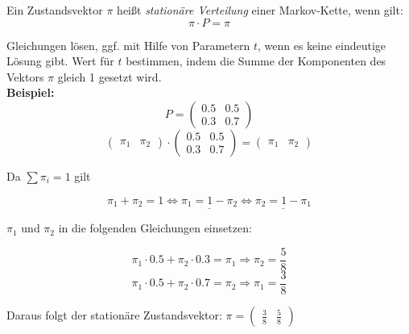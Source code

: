 Ein Zustandsvektor \(\pi\) heißt \emph{stationäre Verteilung} einer Markov-Kette, wenn gilt:
\begin{equation*}
    \pi \cdot P = \pi
\end{equation*}

Gleichungen lösen, ggf. mit Hilfe von Parametern \(t\), wenn es keine eindeutige Lösung gibt. Wert für \(t\) bestimmen, indem die Summe der Komponenten des Vektors \(\pi\) gleich 1 gesetzt wird.\\

\textbf{Beispiel:}
\begin{equation*}
    P = \begin{pmatrix}
        0.5 & 0.5\\
        0.3 & 0.7
    \end{pmatrix}
\end{equation*}
\begin{equation*}
    \begin{pmatrix}
        \pi_1 & \pi_2
    \end{pmatrix} \cdot \begin{pmatrix}
        0.5 & 0.5\\
        0.3 & 0.7
    \end{pmatrix} = \begin{pmatrix}
        \pi_1 & \pi_2
    \end{pmatrix}
\end{equation*}

Da \(\sum \pi_i=1\) gilt

\begin{equation*}
    \pi_1 + \pi_2 = 1 \Leftrightarrow \underline{\pi_1 = 1 - \pi_2} \Leftrightarrow \underline{\pi_2 = 1 - \pi_1}
\end{equation*}

\(\pi_1\) und \(\pi_2\) in die folgenden Gleichungen einsetzen:

\begin{equation*}
    \pi_1 \cdot 0.5 + \pi_2 \cdot 0.3 = \pi_1 \Longrightarrow \pi_2 = \frac{5}{8}
\end{equation*}
\begin{equation*}
    \pi_1 \cdot 0.5 + \pi_2 \cdot 0.7 = \pi_2 \Longrightarrow \pi_1 = \frac{3}{8}
\end{equation*}

Daraus folgt der stationäre Zustandsvektor: \(\pi = \begin{pmatrix}
    \frac{3}{8} & \frac{5}{8}
\end{pmatrix}\)\\


